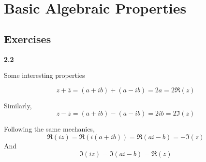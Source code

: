 \section{Basic Algebraic Properties}

\subsection{Exercises}

\textbf{2.2}

Some interesting properties

$$
z + \bar{z} = (a+ib) + (a-ib) = 2a = 2\Re (z)
$$

Similarly,
$$
z - \bar{z} = (a+ib) - (a-ib) = 2ib = 2\Im (z)
$$

Following the same mechanics,
$$
\Re (iz) = \Re (i(a+ib)) = \Re (ai-b) = -\Im (z)
$$
And
$$
\Im (iz) = \Im (ai -b) = \Re (z)
$$
